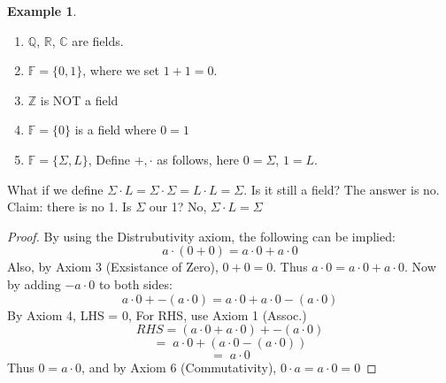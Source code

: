 \documentclass[a4paper, notitlepage]{report}
\newtheorem{theorem}{Theorem}
\theoremstyle{remark}
\theoremstyle{definition}
\newtheorem{example}{Example}
\begin{document}
	    \begin{example}

	      \begin{enumerate}
	        \item $\mathbb{Q}$, $\mathbb{R}$, $\mathbb{C}$ are fields.
            
	    \item $\mathbb{F} = \{0,1\}$, where we set $1+1 = 0$.
            \\
	    \item  $\mathbb{Z}$ is NOT a field
            \\
	    \item  $\mathbb{F} = \{0\}$ is a field where $0 = 1$
            \\
	    \item $\mathbb{F} = \{\Sigma, L\}$, Define $+, \cdot$ as follows, here $0 = \Sigma$, $1 = L$.
            \\

	      \end{enumerate}
	    	    \end{example}
                        What if we define $\Sigma \cdot L = \Sigma \cdot \Sigma = L \cdot L = \Sigma$. Is it still a field? The answer is no.
            \\
            Claim: there is no 1. Is $\Sigma$ our 1? No, $\Sigma \cdot L = \Sigma$
	    \begin{center}
	    \fbox{\begin{minipage}{7in}
	    \begin{theorem}
	      \[a \cdot 0 = 0 \cdot a = 0 \; \forall \; a \in \mathbb{F}\]
	    \end{theorem}
	    \end{minipage}}
	    \end{center}
            \begin{proof}
                By using the Distrubutivity axiom, the following can be implied:
                $$a \cdot (0+0) = a \cdot 0 + a \cdot 0$$
                Also, by Axiom 3 (Exsistance of Zero), $0+0 = 0$. Thus $a \cdot 0 = a \cdot 0 + a \cdot 0$. Now by adding $-a \cdot 0$ to both sides:
                $$a\cdot 0 + -(a\cdot 0) = a \cdot 0 + a \cdot 0 -(a\cdot 0)$$
                By Axiom 4, LHS = 0, For RHS, use Axiom 1 (Assoc.)
                $$RHS = (a \cdot 0 + a \cdot 0) + -(a \cdot 0)$$
                $$= \; a \cdot 0 + (a \cdot 0 - (a \cdot 0))$$
                $$= \; a \cdot 0$$
                Thus $0 = a \cdot 0$, and by Axiom 6 (Commutativity), $0 \cdot a = a \cdot 0 = 0$
            \end{proof}
	    \begin{center}
	    \end{center} 
	                
\end{document}
